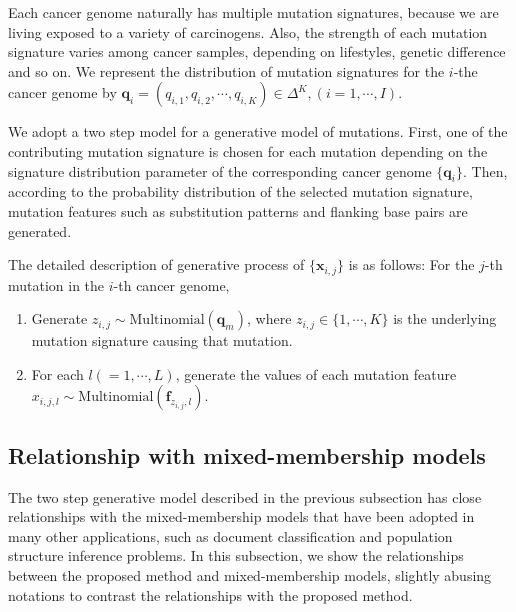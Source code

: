 Each cancer genome naturally has multiple mutation signatures,
because we are living exposed to a variety of carcinogens. 
Also, the strength of each mutation signature varies among cancer samples, 
depending on lifestyles, genetic difference and so on.
We represent the distribution of mutation signatures for the $i$-the cancer genome 
by $\bm{q}_i = (q_{i,1}, q_{i,2}, \cdots, q_{i, K}) \in \Delta^K,  (i = 1, \cdots, I)$.

We adopt a two step model for a generative model of mutations.
First, one of the contributing mutation signature is chosen for each mutation 
depending on the signature distribution parameter of the corresponding cancer genome $\{ \bm{q}_i \}$.
Then, according to the probability distribution of the selected mutation signature, 
mutation features such as substitution patterns and flanking base pairs are generated.

The detailed description of generative process of $\{ \bm{x}_{i,j} \}$ is as follows:
For the $j$-th mutation in the $i$-th cancer genome, 
\begin{enumerate}
\item
Generate $z_{i,j} \sim \text{Multinomial} (\bm{q}_m)$, where $z_{i,j} \in \{1,\cdots,K \}$ is the underlying mutation signature causing that mutation.
\item 
For each $l (= 1, \cdots, L)$, generate the values of each mutation feature $x_{i,j,l} \sim \text{Multinomial}(\bm{f}_{z_{i,j},l})$.
\end{enumerate}




\subsection*{Relationship with mixed-membership models}

The two step generative model described in the previous subsection has close relationships with
the mixed-membership models that have been adopted in many other applications, 
such as document classification and population structure inference problems. 
In this subsection, we show the relationships between the proposed method and mixed-membership models,
slightly abusing notations to contrast the relationships with the proposed method. 

